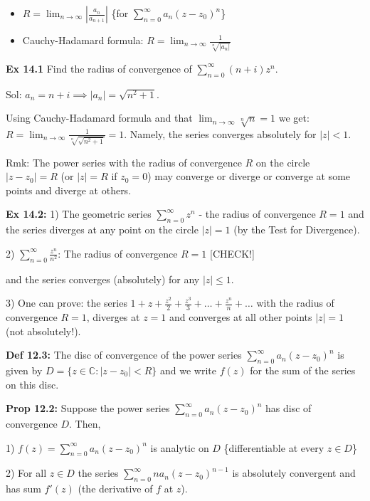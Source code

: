 \documentclass{article}
\begin{document}
\begin{itemize}
    \item $R = \lim_{n \to \infty} \left| \frac{a_n}{a_{n+1}} \right|$ \{for $\sum_{n=0}^{\infty} a_n (z - z_0)^n$\}
    \item Cauchy-Hadamard formula: $R = \lim_{n \to \infty} \frac{1}{\sqrt[n]{|a_n|}}$
\end{itemize}

\textbf{Ex 14.1} Find the radius of convergence of $\sum_{n=0}^{\infty} (n+i)z^n$.

Sol: $a_n = n + i \implies |a_n| = \sqrt{n^2 + 1}$.

Using Cauchy-Hadamard formula and that $\lim_{n \to \infty} \sqrt[n]{n} = 1$ we get: $R = \lim_{n \to \infty} \frac{1}{\sqrt[n]{\sqrt{n^2 + 1}}} = 1$. Namely, the series converges absolutely for $|z| < 1$.

Rmk: The power series with the radius of convergence $R$ on the circle $|z - z_0| = R$ (or $|z| = R$ if $z_0 = 0$) may converge or diverge or converge at some points and diverge at others.

\textbf{Ex 14.2:} 1) The geometric series $\sum_{n=0}^{\infty} z^n$ - the radius of convergence $R = 1$ and the series diverges at any point on the circle $|z| = 1$ (by the Test for Divergence).

2) $\sum_{n=0}^{\infty} \frac{z^n}{n^2}$: The radius of convergence $R = 1$ [CHECK!]

and the series converges (absolutely) for any $|z| \leq 1$.

3) One can prove: the series $1 + z + \frac{z^2}{2} + \frac{z^3}{3} + \dots + \frac{z^n}{n} + \dots$ with the radius of convergence $R = 1$, diverges at $z = 1$ and converges at all other points $|z| = 1$ (not absolutely!).

\textbf{Def 12.3:} The disc of convergence of the power series $\sum_{n=0}^{\infty} a_n (z - z_0)^n$ is given by $D = \{z \in \mathbb{C}: |z - z_0| < R\}$ and we write $f(z)$ for the sum of the series on this disc.

\textbf{Prop 12.2:} Suppose the power series $\sum_{n=0}^{\infty} a_n (z - z_0)^n$ has disc of convergence $D$. Then,

1) $f(z) = \sum_{n=0}^{\infty} a_n (z - z_0)^n$ is analytic on $D$ \{differentiable at every $z \in D$\}

2) For all $z \in D$ the series $\sum_{n=0}^{\infty} na_n (z - z_0)^{n-1}$ is absolutely convergent and has sum $f'(z)$ (the derivative of $f$ at $z$).
\end{document}
